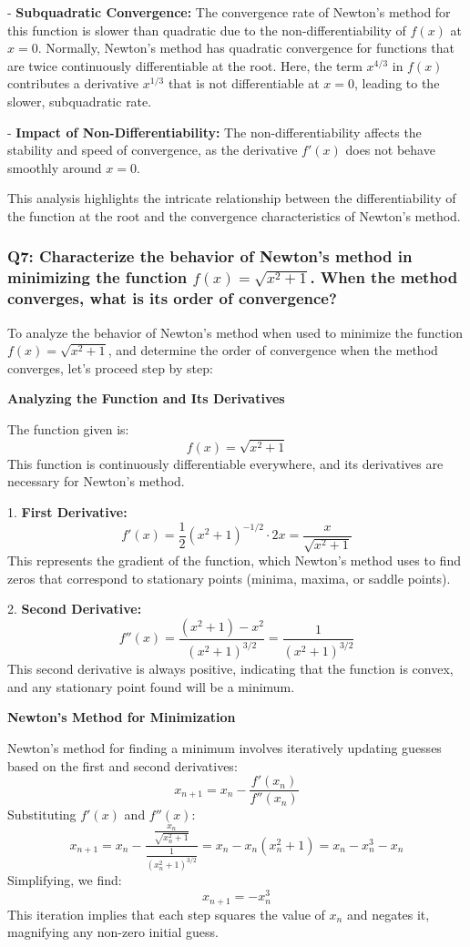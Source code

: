 \documentclass[8pt]{article}
\begin{document}
- \textbf{Subquadratic Convergence:} The convergence rate of Newton's method for this function is slower than quadratic due to the non-differentiability of \(f(x)\) at \(x = 0\). Normally, Newton's method has quadratic convergence for functions that are twice continuously differentiable at the root. Here, the term \(x^{4/3}\) in \(f(x)\) contributes a derivative \(x^{1/3}\) that is not differentiable at \(x = 0\), leading to the slower, subquadratic rate.

- \textbf{Impact of Non-Differentiability:} The non-differentiability affects the stability and speed of convergence, as the derivative \(f'(x)\) does not behave smoothly around \(x = 0\).

This analysis highlights the intricate relationship between the differentiability of the function at the root and the convergence characteristics of Newton's method.

\subsubsection*{Q7: Characterize the behavior of Newton’s method in minimizing the function \(f(x) = \sqrt{x^2 + 1}\). When the method converges, what is its order of convergence?}

To analyze the behavior of Newton’s method when used to minimize the function \(f(x) = \sqrt{x^2 + 1}\), and determine the order of convergence when the method converges, let's proceed step by step:

\textbf{Analyzing the Function and Its Derivatives}

The function given is:
\[
f(x) = \sqrt{x^2 + 1}
\]
This function is continuously differentiable everywhere, and its derivatives are necessary for Newton's method.

1. \textbf{First Derivative:}
   \[
   f'(x) = \frac{1}{2}(x^2 + 1)^{-1/2} \cdot 2x = \frac{x}{\sqrt{x^2 + 1}}
   \]
   This represents the gradient of the function, which Newton's method uses to find zeros that correspond to stationary points (minima, maxima, or saddle points).

2. \textbf{Second Derivative:}
   \[
   f''(x) = \frac{(x^2 + 1) - x^2}{(x^2 + 1)^{3/2}} = \frac{1}{(x^2 + 1)^{3/2}}
   \]
   This second derivative is always positive, indicating that the function is convex, and any stationary point found will be a minimum.

\textbf{Newton's Method for Minimization}

Newton’s method for finding a minimum involves iteratively updating guesses based on the first and second derivatives:
\[
x_{n+1} = x_n - \frac{f'(x_n)}{f''(x_n)}
\]
Substituting \(f'(x)\) and \(f''(x)\):
\[
x_{n+1} = x_n - \frac{\frac{x_n}{\sqrt{x_n^2 + 1}}}{\frac{1}{(x_n^2 + 1)^{3/2}}} = x_n - x_n(x_n^2 + 1) = x_n - x_n^3 - x_n
\]
Simplifying, we find:
\[
x_{n+1} = -x_n^3
\]
This iteration implies that each step squares the value of \(x_n\) and negates it, magnifying any non-zero initial guess.
\end{document}
